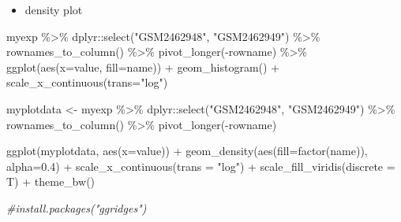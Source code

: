 \documentclass[
]{book}
\newenvironment{Shaded}{\begin{snugshade}}{\end{snugshade}}
\newcommand{\AttributeTok}[1]{\textcolor[rgb]{0.77,0.63,0.00}{#1}}
\newcommand{\CommentTok}[1]{\textcolor[rgb]{0.56,0.35,0.01}{\textit{#1}}}
\newcommand{\FloatTok}[1]{\textcolor[rgb]{0.00,0.00,0.81}{#1}}
\newcommand{\FunctionTok}[1]{\textcolor[rgb]{0.00,0.00,0.00}{#1}}
\newcommand{\NormalTok}[1]{#1}
\newcommand{\OtherTok}[1]{\textcolor[rgb]{0.56,0.35,0.01}{#1}}
\newcommand{\SpecialCharTok}[1]{\textcolor[rgb]{0.00,0.00,0.00}{#1}}
\newcommand{\StringTok}[1]{\textcolor[rgb]{0.31,0.60,0.02}{#1}}
\providecommand{\tightlist}{%
  \setlength{\itemsep}{0pt}\setlength{\parskip}{0pt}}
\begin{document}
\begin{itemize}
\tightlist
\item
  density plot
\end{itemize}

\begin{Shaded}
\begin{Highlighting}[]

\NormalTok{myexp }\SpecialCharTok{\%\textgreater{}\%} 
\NormalTok{  dplyr}\SpecialCharTok{::}\FunctionTok{select}\NormalTok{(}\StringTok{"GSM2462948"}\NormalTok{, }\StringTok{"GSM2462949"}\NormalTok{) }\SpecialCharTok{\%\textgreater{}\%}
  \FunctionTok{rownames\_to\_column}\NormalTok{() }\SpecialCharTok{\%\textgreater{}\%} 
  \FunctionTok{pivot\_longer}\NormalTok{(}\SpecialCharTok{{-}}\NormalTok{rowname) }\SpecialCharTok{\%\textgreater{}\%} 
  \FunctionTok{ggplot}\NormalTok{(}\FunctionTok{aes}\NormalTok{(}\AttributeTok{x=}\NormalTok{value, }\AttributeTok{fill=}\NormalTok{name)) }\SpecialCharTok{+} 
    \FunctionTok{geom\_histogram}\NormalTok{() }\SpecialCharTok{+}
    \FunctionTok{scale\_x\_continuous}\NormalTok{(}\AttributeTok{trans=}\StringTok{"log"}\NormalTok{) }
\end{Highlighting}
\end{Shaded}

\begin{Shaded}
\begin{Highlighting}[]
\NormalTok{myplotdata }\OtherTok{\textless{}{-}}\NormalTok{ myexp }\SpecialCharTok{\%\textgreater{}\%} 
\NormalTok{  dplyr}\SpecialCharTok{::}\FunctionTok{select}\NormalTok{(}\StringTok{"GSM2462948"}\NormalTok{, }\StringTok{"GSM2462949"}\NormalTok{) }\SpecialCharTok{\%\textgreater{}\%}
  \FunctionTok{rownames\_to\_column}\NormalTok{() }\SpecialCharTok{\%\textgreater{}\%} 
  \FunctionTok{pivot\_longer}\NormalTok{(}\SpecialCharTok{{-}}\NormalTok{rowname) }

\FunctionTok{ggplot}\NormalTok{(myplotdata, }\FunctionTok{aes}\NormalTok{(}\AttributeTok{x=}\NormalTok{value)) }\SpecialCharTok{+}
  \FunctionTok{geom\_density}\NormalTok{(}\FunctionTok{aes}\NormalTok{(}\AttributeTok{fill=}\FunctionTok{factor}\NormalTok{(name)), }\AttributeTok{alpha=}\FloatTok{0.4}\NormalTok{) }\SpecialCharTok{+}
  \FunctionTok{scale\_x\_continuous}\NormalTok{(}\AttributeTok{trans =} \StringTok{"log"}\NormalTok{) }\SpecialCharTok{+}
  \FunctionTok{scale\_fill\_viridis}\NormalTok{(}\AttributeTok{discrete =}\NormalTok{ T) }\SpecialCharTok{+}
  \FunctionTok{theme\_bw}\NormalTok{()}

\CommentTok{\#install.packages("ggridges")}
\end{Highlighting}
\end{Shaded}
\end{document}
